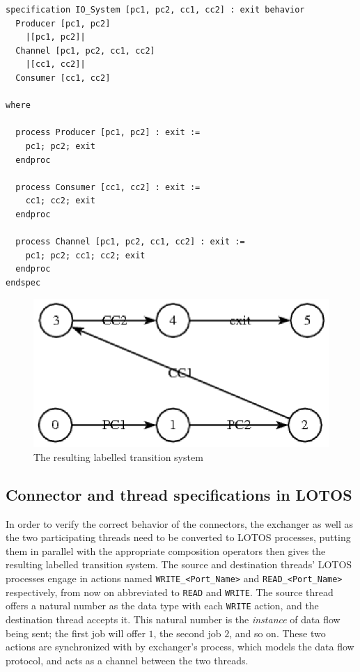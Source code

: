 \begin{minipage}{\listingwidth}
\lstset{language=lotos}
\begin{lstlisting}[label=lst:lotos_ex, caption=An example of a LOTOS
    specification]
specification IO_System [pc1, pc2, cc1, cc2] : exit behavior
  Producer [pc1, pc2]
    |[pc1, pc2]|
  Channel [pc1, pc2, cc1, cc2]
    |[cc1, cc2]|
  Consumer [cc1, cc2]

where

  process Producer [pc1, pc2] : exit :=
    pc1; pc2; exit
  endproc

  process Consumer [cc1, cc2] : exit :=
    cc1; cc2; exit
  endproc

  process Channel [pc1, pc2, cc1, cc2] : exit :=
    pc1; pc2; cc1; cc2; exit
  endproc
endspec
\end{lstlisting}
\end{minipage}

\begin{figure}
\centering
\includegraphics[scale=1]{figs/ex1}
\caption{The resulting labelled transition system}
\label{fig:lotos_ex}
\end{figure}

\subsection{Connector and thread specifications in LOTOS}
In order to verify the correct behavior of the connectors, the
exchanger as well as the two participating threads need to be
converted to LOTOS processes, putting them in parallel with the
appropriate composition operators then gives the resulting labelled
transition system. The source and destination threads' LOTOS processes
engage in actions named \texttt{WRITE\_<Port\_Name>} and
\texttt{READ\_<Port\_Name>} respectively, from now on abbreviated to
\texttt{READ} and \texttt{WRITE}. The source thread offers a natural
number as the data type with each \texttt{WRITE} action, and the
destination thread accepts it. This natural number is the
\emph{instance} of data flow being sent; the first job will offer $1$,
the second job $2$, and so on. These two actions are synchronized with
by exchanger's process, which models the data flow protocol, and acts
as a channel between the two threads.

